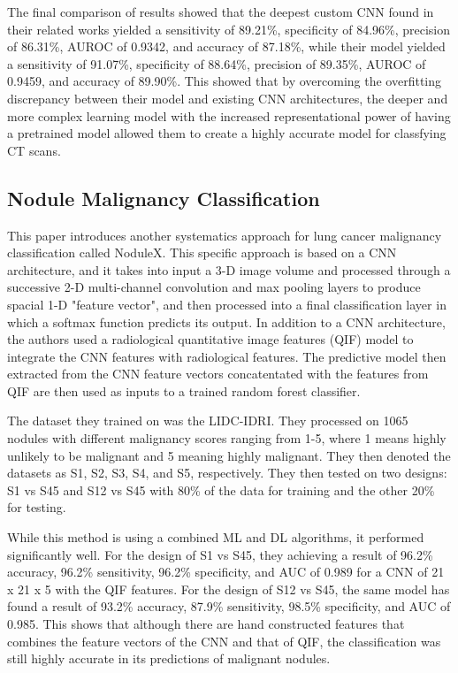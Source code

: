 \documentclass[10pt,twocolumn,letterpaper]{article}
\begin{document}
      The final comparison of results showed that the deepest custom CNN found in their related works yielded a sensitivity of
      89.21\%, specificity of 84.96\%, precision of 86.31\%, AUROC of 0.9342, and accuracy of 87.18\%, while their model
      yielded a sensitivity of 91.07\%, specificity of 88.64\%, precision of 89.35\%, AUROC of 0.9459, and accuracy of 89.90\%.
      This showed that by overcoming the overfitting discrepancy between their model and existing CNN architectures, the
      deeper and more complex learning model with the increased representational power of having a pretrained model
      allowed them to create a highly accurate model for classfying CT scans.

   \subsection{Nodule Malignancy Classification} \label{sec:related-nodulex}
      This paper \cite{nodulex} introduces another systematics approach for lung cancer malignancy classification called
      NoduleX. This specific approach is based on a CNN architecture, and it takes into input a 3-D image volume and processed
      through a successive 2-D multi-channel convolution and max pooling layers to produce spacial 1-D "feature vector",
      and then processed into a final classification layer in which a softmax function predicts its output. In addition
      to a CNN architecture, the authors used a radiological quantitative image features (QIF) model to integrate
      the CNN features with radiological features. The predictive model then extracted from the CNN feature vectors concatentated
      with the features from QIF are then used as inputs to a trained random forest classifier.

      The dataset they trained on was the LIDC-IDRI. They processed on 1065 nodules with different malignancy scores ranging
      from 1-5, where 1 means highly unlikely to be malignant and 5 meaning highly malignant. They then denoted the datasets as
      S1, S2, S3, S4, and S5, respectively. They then tested on two designs: S1 vs S45 and S12 vs S45 with 80\% of the data
      for training and the other 20\% for testing.
    
      While this method is using a combined ML and DL algorithms, it performed significantly well. For the design of S1 vs S45,
      they achieving a result of 96.2\% accuracy, 96.2\% sensitivity, 96.2\% specificity, and AUC of 0.989 for a CNN of 21 x 21 x 5 with the QIF
      features. For the design of S12 vs S45, the same model has found a result of 93.2\% accuracy, 87.9\% sensitivity, 98.5\% specificity, and AUC of 0.985.
      This shows that although there are hand constructed features that combines the feature vectors of the CNN and that of QIF,
      the classification was still highly accurate in its predictions of malignant nodules.
\end{document}
